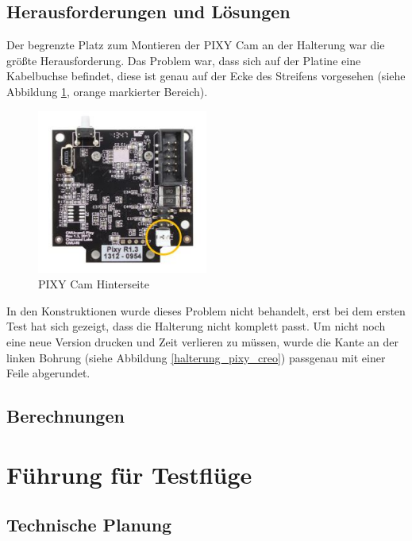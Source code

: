 			\newpage

	\subsection{Herausforderungen und Lösungen}

	Der begrenzte Platz zum Montieren der PIXY Cam an der Halterung war die größte Herausforderung.
	Das  Problem war, dass sich auf der Platine eine Kabelbuchse befindet, diese ist genau auf der Ecke des Streifens vorgesehen (siehe Abbildung \ref{pixy_back}, orange markierter Bereich).

			\begin{figure}[tbh]
			\begin{centering}
			\includegraphics[width = 0.5\textwidth]{Bilder/pixy_back}
			\par\end{centering}
			\caption{PIXY Cam Hinterseite}
			\label{pixy_back}
			\end{figure}

	In den Konstruktionen wurde dieses Problem nicht behandelt, erst bei dem ersten Test hat sich gezeigt, dass die Halterung nicht komplett passt.
	Um nicht noch eine neue Version drucken und Zeit verlieren zu müssen, wurde die Kante an der linken Bohrung (siehe Abbildung \ref{halterung_pixy_creo}) passgenau mit einer Feile abgerundet.

	\subsection{Berechnungen}

\section{Führung für Testflüge}

	\subsection{Technische Planung}

